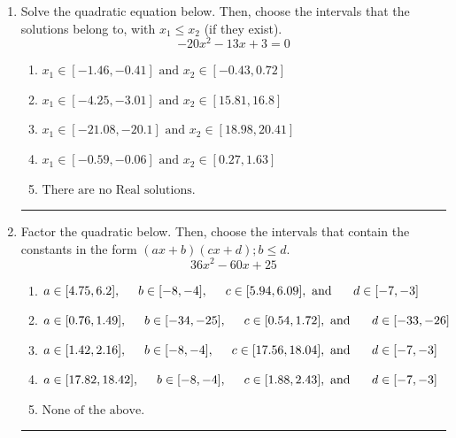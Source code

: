\documentclass[14pt]{extbook}
\newcommand{\litem}[1]{\item#1\hspace*{-1cm}\rule{\textwidth}{0.4pt}}
\begin{document}
\begin{enumerate}
{\begin{enumerate}[label=\Alph*.]
\end{enumerate} }
\litem{
Solve the quadratic equation below. Then, choose the intervals that the solutions belong to, with $x_1 \leq x_2$ (if they exist).\[ -20x^{2} -13 x + 3 = 0 \]\begin{enumerate}[label=\Alph*.]
\item \( x_1 \in [-1.46, -0.41] \text{ and } x_2 \in [-0.43, 0.72] \)
\item \( x_1 \in [-4.25, -3.01] \text{ and } x_2 \in [15.81, 16.8] \)
\item \( x_1 \in [-21.08, -20.1] \text{ and } x_2 \in [18.98, 20.41] \)
\item \( x_1 \in [-0.59, -0.06] \text{ and } x_2 \in [0.27, 1.63] \)
\item \( \text{There are no Real solutions.} \)

\end{enumerate} }
\litem{
Factor the quadratic below. Then, choose the intervals that contain the constants in the form $(ax+b)(cx+d); b \leq d.$\[ 36x^{2} -60 x + 25 \]\begin{enumerate}[label=\Alph*.]
\item \( a \in [4.75, 6.2], \hspace*{5mm} b \in [-8, -4], \hspace*{5mm} c \in [5.94, 6.09], \text{ and } \hspace*{5mm} d \in [-7, -3] \)
\item \( a \in [0.76, 1.49], \hspace*{5mm} b \in [-34, -25], \hspace*{5mm} c \in [0.54, 1.72], \text{ and } \hspace*{5mm} d \in [-33, -26] \)
\item \( a \in [1.42, 2.16], \hspace*{5mm} b \in [-8, -4], \hspace*{5mm} c \in [17.56, 18.04], \text{ and } \hspace*{5mm} d \in [-7, -3] \)
\item \( a \in [17.82, 18.42], \hspace*{5mm} b \in [-8, -4], \hspace*{5mm} c \in [1.88, 2.43], \text{ and } \hspace*{5mm} d \in [-7, -3] \)
\item \( \text{None of the above.} \)


\end{enumerate}}
\end{enumerate}
\end{document}
